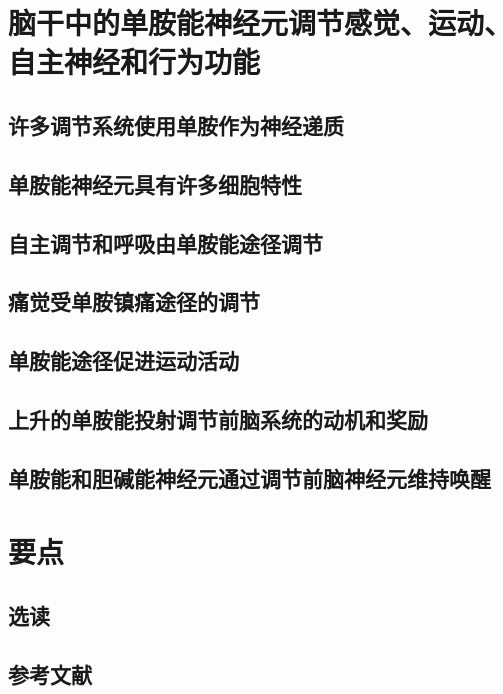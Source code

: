 \section{脑干中的单胺能神经元调节感觉、运动、自主神经和行为功能}
\subsection{许多调节系统使用单胺作为神经递质}
\subsection{单胺能神经元具有许多细胞特性}
\subsection{自主调节和呼吸由单胺能途径调节}
\subsection{痛觉受单胺镇痛途径的调节}
\subsection{单胺能途径促进运动活动}
\subsection{上升的单胺能投射调节前脑系统的动机和奖励}
\subsection{单胺能和胆碱能神经元通过调节前脑神经元维持唤醒}

\section{要点}
\subsection{选读}
\subsection{参考文献}